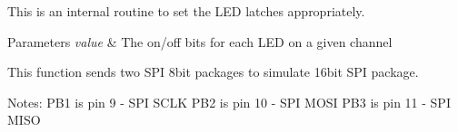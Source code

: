 This is an internal routine to set the L\+E\+D latches appropriately. 


\begin{DoxyParams}{Parameters}
{\em value} & The on/off bits for each L\+E\+D on a given channel\\
\hline
\end{DoxyParams}
This function sends two S\+P\+I 8bit packages to simulate 16bit S\+P\+I package.

Notes\+: P\+B1 is pin 9 -\/ S\+P\+I S\+C\+L\+K P\+B2 is pin 10 -\/ S\+P\+I M\+O\+S\+I P\+B3 is pin 11 -\/ S\+P\+I M\+I\+S\+O 
